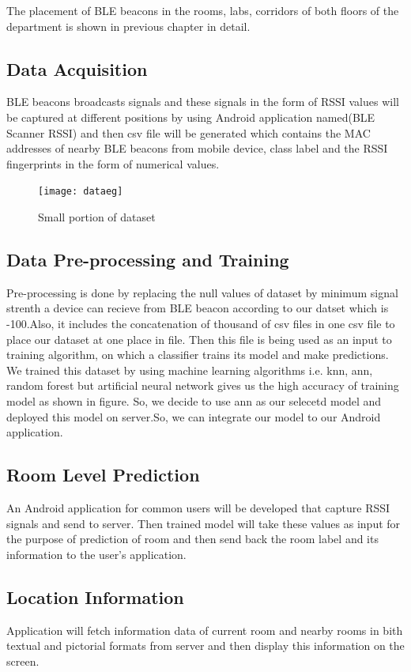 The placement of BLE beacons in the rooms, labs, corridors of both floors of the department is shown in previous chapter in detail.
\\

 \subsection{Data Acquisition}
BLE beacons broadcasts signals and these signals in the form of RSSI values will be captured at different positions by using Android application named(BLE Scanner RSSI) and then csv file will be generated which contains the MAC addresses of nearby BLE beacons from mobile device, class label and the RSSI fingerprints in the form of numerical values.

\begin{figure}
\begin{center}
\texttt{[image: dataeg]}
\caption{Small portion of dataset}
\label{fig:23}
\end{center}
\end{figure}

\clearpage
 \subsection{Data Pre-processing and Training}
Pre-processing is done by replacing the null values of dataset by minimum signal strenth a device can recieve from BLE beacon according to our datset which is -100.Also, it includes the concatenation of thousand of csv files in one csv file to place our dataset at one place in file. Then this file is being used as an input to training algorithm, on which a classifier trains its model and make predictions. We trained this dataset by using machine learning algorithms i.e. knn, ann, random forest but artificial neural network gives us the high accuracy of training model as shown in figure. So, we decide to use ann as our selecetd model  and deployed this model on server.So, we can integrate our model to our Android application. 


\subsection{Room Level Prediction}
An Android application for common users will be developed that capture RSSI signals and send to server. Then trained model will take these values as input for the purpose of prediction of room and then send back the room label and its information to the user's application.
\subsection{Location Information}
Application will fetch information data of current room and nearby rooms in bith textual and pictorial formats from server and then display this information on the screen.








